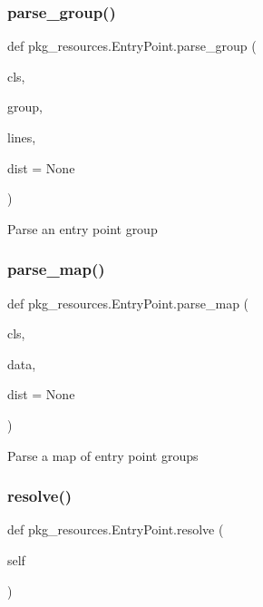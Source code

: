 \subsubsection{\texorpdfstring{parse\+\_\+group()}{parse\_group()}}
{\footnotesize\ttfamily def pkg\+\_\+resources.\+Entry\+Point.\+parse\+\_\+group (\begin{DoxyParamCaption}\item[{}]{cls,  }\item[{}]{group,  }\item[{}]{lines,  }\item[{}]{dist = {\ttfamily None} }\end{DoxyParamCaption})}

\begin{DoxyVerb}Parse an entry point group\end{DoxyVerb}
 \mbox{\label{classpkg__resources_1_1_entry_point_a925bbccfaed5f41e1f676adb88199afa}} 
\subsubsection{\texorpdfstring{parse\+\_\+map()}{parse\_map()}}
{\footnotesize\ttfamily def pkg\+\_\+resources.\+Entry\+Point.\+parse\+\_\+map (\begin{DoxyParamCaption}\item[{}]{cls,  }\item[{}]{data,  }\item[{}]{dist = {\ttfamily None} }\end{DoxyParamCaption})}

\begin{DoxyVerb}Parse a map of entry point groups\end{DoxyVerb}
 \mbox{\label{classpkg__resources_1_1_entry_point_a8c0fa0efa7012aab6b5711f0932bac9a}} 
\subsubsection{\texorpdfstring{resolve()}{resolve()}}
{\footnotesize\ttfamily def pkg\+\_\+resources.\+Entry\+Point.\+resolve (\begin{DoxyParamCaption}\item[{}]{self }\end{DoxyParamCaption})}

